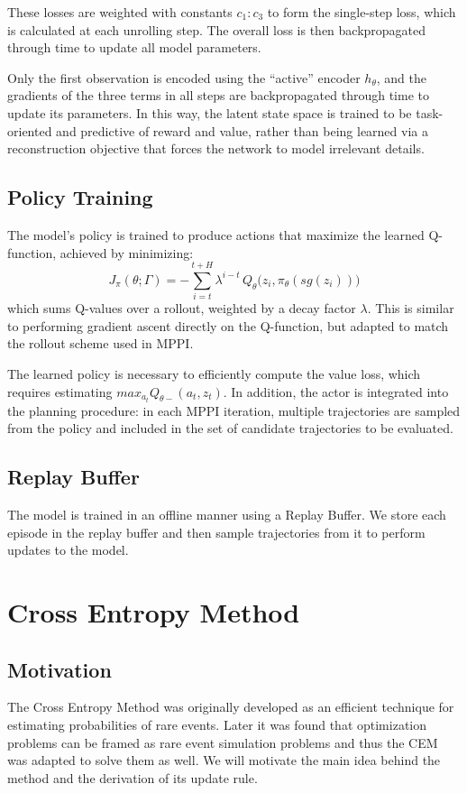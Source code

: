 \documentclass{article}
\begin{document}
These losses are weighted with constants $c_1:c_3$ to form the single-step loss, which is calculated at each unrolling step.  
The overall loss is then backpropagated through time to update all model parameters.
\vspace{1em}

Only the first observation is encoded using the ``active'' encoder $h_\theta$, and the gradients of the three terms in all steps are backpropagated through time to update its parameters. In this way, the latent state space is trained to be task-oriented and predictive of reward and value, rather than being learned via a reconstruction objective that forces the network to model irrelevant details.

\subsection{Policy Training}

The model's policy is trained to produce actions that maximize the learned Q-function, achieved by minimizing:
\begin{equation}
J_\pi(\theta; \Gamma) = - \sum_{i=t}^{t+H} \lambda^{i-t} \, Q_\theta \big( z_i, \pi_\theta(sg(z_i)) \big)
\end{equation}
which sums Q-values over a rollout, weighted by a decay factor $\lambda$. This is similar to performing gradient ascent directly on the Q-function, but adapted to match the rollout scheme used in MPPI.
\vspace{1em}

The learned policy is necessary to efficiently compute the value loss, which requires estimating $max_{a_t}Q_{\theta-}(a_t,z_t)$. In addition, the actor is integrated into the planning procedure: in each MPPI iteration, multiple trajectories are sampled from the policy and included in the set of candidate trajectories to be evaluated.

\subsection{Replay Buffer}
The model is trained in an offline manner using a Replay Buffer. We store each episode in the replay buffer and then sample trajectories from it to perform updates to the model.  
\section{Cross Entropy Method}

\subsection{Motivation}
The Cross Entropy Method was originally developed as an efficient technique for estimating probabilities of rare events. Later it was found that optimization problems can be framed as rare event simulation problems and thus the CEM was adapted to solve them as well. We will motivate the main idea behind the method and the derivation of its update rule.
\end{document}
